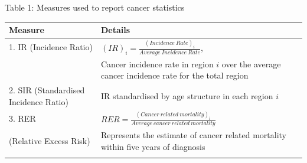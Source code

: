 \documentclass[11pt,]{article}
\begin{document}
Table 1: Measures used to report cancer statistics

\begin{longtable}[]{@{}ll@{}}
\toprule
\begin{minipage}[b]{0.28\columnwidth}\raggedright
Measure\strut
\end{minipage} & \begin{minipage}[b]{0.66\columnwidth}\raggedright
Details\strut
\end{minipage}\tabularnewline
\midrule
\endhead
\begin{minipage}[t]{0.28\columnwidth}\raggedright
1. IR (Incidence Ratio)\strut
\end{minipage} & \begin{minipage}[t]{0.66\columnwidth}\raggedright
\((IR)_i=\frac{(Incidence\ Rate)_i}{Average\ Incidence\ Rate}\),\strut
\end{minipage}\tabularnewline
\begin{minipage}[t]{0.28\columnwidth}\raggedright
\strut
\end{minipage} & \begin{minipage}[t]{0.66\columnwidth}\raggedright
Cancer incidence rate in region \(i\) over the average cancer incidence
rate for the total region\strut
\end{minipage}\tabularnewline
\begin{minipage}[t]{0.28\columnwidth}\raggedright
2. SIR (Standardised Incidence Ratio)\strut
\end{minipage} & \begin{minipage}[t]{0.66\columnwidth}\raggedright
IR standardised by age structure in each region \(i\)\strut
\end{minipage}\tabularnewline
\begin{minipage}[t]{0.28\columnwidth}\raggedright
3. RER\strut
\end{minipage} & \begin{minipage}[t]{0.66\columnwidth}\raggedright
\(RER = \frac{(Cancer\ related\ mortality)_i}{Average\ cancer\ related\ mortality}\)\strut
\end{minipage}\tabularnewline
\begin{minipage}[t]{0.28\columnwidth}\raggedright
(Relative Excess Risk)\strut
\end{minipage} & \begin{minipage}[t]{0.66\columnwidth}\raggedright
Represents the estimate of cancer related mortality within five years of
diagnosis\strut
\end{minipage}\tabularnewline
\begin{minipage}[t]{0.28\columnwidth}\raggedright

\end{minipage}
\end{longtable}
\end{document}
